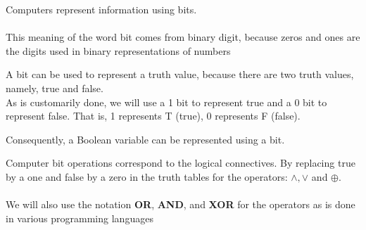 \begin{center}
\noindent{}
\end{center}
\begin{tcolorbox}[colback=white, colframe=gray!60, title=Remark 1]
Computers represent information using bits. \\ \\
This meaning of the word bit comes from binary digit, because zeros and
ones are the digits used in binary representations of numbers
\end{tcolorbox}
\begin{tcolorbox}[colback=white, colframe=gray!60, title=Remark 2]
A bit can be used to represent a truth value, because
there are two truth values, namely, true and false. \\ As is customarily done, we will use a 1 bit
to represent true and a 0 bit to represent false. That is, 1 represents T (true), 0 represents F
(false).
\end{tcolorbox}
\begin{center}
\noindent{}
\end{center}
\begin{tcolorbox}[colback=white, colframe=gray!60, title=Remark 3]
Consequently, a Boolean variable can be represented using a bit.
\end{tcolorbox}
\begin{tcolorbox}[colback=white, colframe=gray!60, title=Remark 4]
Computer bit operations correspond to the logical connectives. By replacing true by a one
and false by a zero in the truth tables for the operators: $\land , \lor$ and $\oplus$.
\\ \\ 
We will also use the notation \textbf{OR}, \textbf{AND}, and \textbf{XOR} for the operators as is done in various programming languages
\end{tcolorbox}
